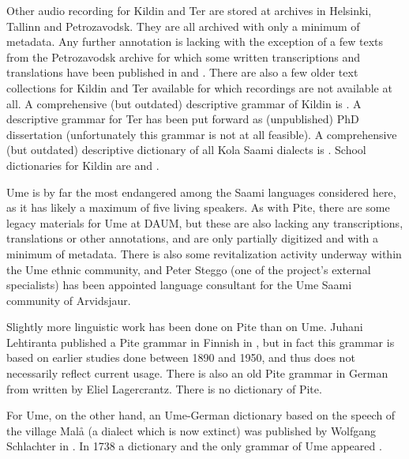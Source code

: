 \documentclass[a4paper,12pt]{article}
\begin{document}
Other audio recording for Kildin and Ter are stored at archives in Helsinki, Tallinn and Petrozavodsk. They are all archived with only a minimum of metadata. Any further annotation is lacking with the exception of a few texts from the Petrozavodsk archive for which some written transcriptions and translations have been published in \citealt{kert1961} and \citealt{panfilov-etal1988}. There are also a few older text collections for Kildin and Ter available for which recordings are not available at all. A comprehensive (but outdated) descriptive grammar of Kildin is \citealt{kert1971}. A descriptive grammar for Ter has been put forward as (unpublished) PhD dissertation \cite{tereskin2002a} (unfortunately this grammar is not at all feasible). A comprehensive (but outdated) descriptive dictionary of all Kola Saami dialects is \citealt{itkonen_t_i1958a}. School dictionaries for Kildin are \citealt{kuruc-etal1985} and \citealt{kert1986}.

Ume is by far the most endangered among the Saami languages considered here, as it has likely a maximum of five living speakers. As with Pite, there are some legacy materials for Ume at DAUM, but these are also lacking any transcriptions, translations or other annotations, and are only partially digitized and with a minimum of metadata. 
There is also some revitalization activity underway within the Ume ethnic community, and Peter Steggo (one of the project's external specialists) has been appointed language consultant for the Ume Saami community of Arvidsjaur.%

Slightly more linguistic work has been done on Pite than on Ume. Juhani Lehtiranta published a Pite grammar in Finnish in \citeyear{lehtiranta1992}, but in fact this grammar is based on earlier studies done between 1890 and 1950, and thus does not necessarily reflect current usage. There is also an old Pite grammar in German from \citeyear{lagercrantz1926} written by Eliel Lagercrantz. There is no dictionary of Pite.

For Ume, on the other hand, an Ume-German dictionary based on the speech of the village Malå (a dialect which is now extinct) was published by Wolfgang Schlachter in \citeyear{schlachter1958}. In 1738 a dictionary and the only grammar of Ume appeared \cite{fjellstrom1738a,1738b}.
\end{document}
